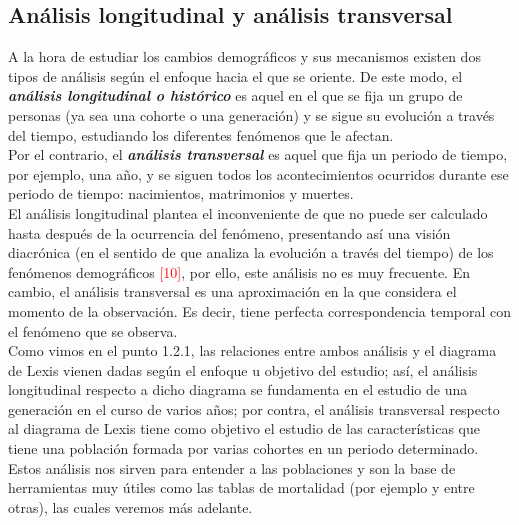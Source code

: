 \subsection{An\'alisis longitudinal y an\'alisis transversal}

A la hora de estudiar los cambios demogr\'aficos y sus mecanismos existen dos tipos de an\'alisis seg\'un el enfoque hacia el que se oriente. De este modo, el \textbf{\textit{an\'alisis longitudinal o hist\'orico}} es aquel en el que se fija un grupo de personas (ya sea una cohorte o una generaci\'on) y se sigue su evoluci\'on a trav\'es del tiempo, estudiando los diferentes fen\'omenos que le afectan.\\ 

Por el contrario, el \textbf{\textit{an\'alisis transversal}} es aquel que fija un periodo de tiempo, por ejemplo, una a\~no, y se siguen todos los acontecimientos ocurridos durante ese periodo de tiempo: nacimientos, matrimonios y muertes.\\

\vspace{-0.2cm}
El an\'alisis longitudinal plantea el inconveniente de que no puede ser calculado hasta despu\'es de la ocurrencia del fen\'omeno, presentando as\'i una visi\'on diacr\'onica (en el sentido de que analiza la evoluci\'on a trav\'es del tiempo)  de los fen\'omenos demogr\'aficos \textcolor{red}{[10]}, por ello, este an\'alisis no es muy frecuente. En cambio, el an\'alisis transversal es una aproximaci\'on en la que considera el momento de la observaci\'on. Es decir, tiene perfecta correspondencia temporal con el fen\'omeno que se observa.\\

\vspace{-0.2cm}
Como vimos en el punto 1.2.1, las relaciones entre ambos an\'alisis y el diagrama de Lexis vienen dadas seg\'un el enfoque u objetivo del estudio; as\'i, el an\'alisis longitudinal respecto a dicho diagrama se fundamenta en el estudio de una generaci\'on en el curso de varios a\~nos; por contra, el an\'alisis transversal respecto al diagrama de Lexis tiene como objetivo el estudio de las caracter\'isticas que tiene una poblaci\'on formada por varias cohortes en un periodo determinado.\\

\vspace{-0.2cm}
Estos an\'alisis nos sirven para entender a las poblaciones y son la base de herramientas muy \'utiles como las tablas de mortalidad (por ejemplo y entre otras), las cuales veremos m\'as adelante.

